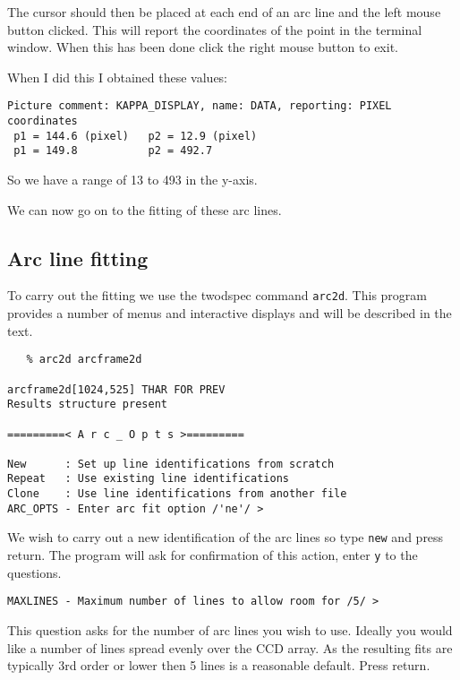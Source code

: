 \documentclass[twoside,11pt]{article}
\newcommand{\xref}[3]{#1}
\newcommand{\scspec}[2]{#1}
\newcommand{\scspec}[2]{#2}
\begin{document}
The cursor should then be placed at each end of an arc line and the
left mouse button clicked. This will report the coordinates of the
point in the terminal window. When this has been done click the right
mouse button to exit.

When I did this I obtained these values:

{
\scspec{\small}{ }
\begin{verbatim}
Picture comment: KAPPA_DISPLAY, name: DATA, reporting: PIXEL coordinates
 p1 = 144.6 (pixel)   p2 = 12.9 (pixel)
 p1 = 149.8           p2 = 492.7
\end{verbatim}
} 

So we have a range of 13 to 493 in the y-axis.

We can now go on to the fitting of these arc lines.

\subsection{Arc line fitting}

To carry out the fitting we use the \xref{{\sc twodspec}}{sun16}{}
command {\tt arc2d}. This program provides a number of menus and
interactive displays and will be described in the text.


{
\scspec{\small}{ }
\begin{verbatim}
   % arc2d arcframe2d      

arcframe2d[1024,525] THAR FOR PREV
Results structure present

=========< A r c _ O p t s >=========

New      : Set up line identifications from scratch
Repeat   : Use existing line identifications
Clone    : Use line identifications from another file
ARC_OPTS - Enter arc fit option /'ne'/ >

\end{verbatim}
}

We wish to carry out a new identification of the arc lines so type
{\tt new} and press return. The program will ask for confirmation of
this action, enter {\tt y} to the questions.

{
\scspec{\small}{ }
\begin{verbatim}
MAXLINES - Maximum number of lines to allow room for /5/ >
\end{verbatim}
}

This question asks for the number of arc lines you wish to use.
Ideally you would like a number of lines spread evenly over the CCD
array. As the resulting fits are typically 3rd order or lower then 5
lines is a reasonable default. Press return.
\end{document}
